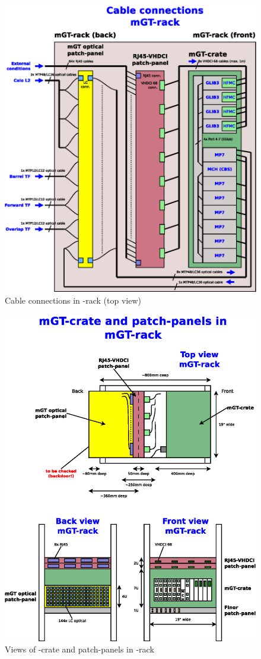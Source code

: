 \begin{figure}[htb]
\centering
\includegraphics[width=14cm]{figures/mGT_rack_cabling}
\caption{Cable connections in \ugt-rack (top view)} 
\label{fig:com-hard:mGT_rack_cabling}
\end{figure}

\clearpage

\begin{figure}[htb]
\centering
\includegraphics[width=14cm]{figures/mGT_rack_cabling_views}
\caption{Views of \ugt-crate and patch-panels in \ugt-rack} 
\label{fig:com-hard:mGT_rack_cabling_views}
\end{figure}

